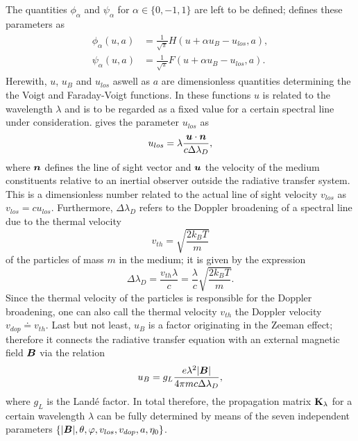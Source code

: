 \documentclass[a4paper,12pt]{report}
\begin{document}
The quantities $\phi_\alpha$ and $\psi_\alpha$ for $\alpha \in \{0,-1,1\}$ are left to be defined; \cite[p.123]{delToroIniesta.2003} defines these parameters as \begin{align}
\begin{aligned}
\phi_\alpha(u,a) &= \frac{1}{\sqrt{\pi}}H(u + \alpha u_B - u_{los}, a), \\
\psi_\alpha(u,a) &= \frac{1}{\sqrt{\pi}}F(u + \alpha u_B - u_{los},a).
\end{aligned}
\end{align} Herewith, $u$, $u_B$ and $u_{los}$ aswell as $a$ are dimensionless quantities determining the the Voigt and Faraday-Voigt functions. In these functions $u$ is related to the wavelength $\lambda$ and is to be regarded as a fixed value for a certain spectral line under consideration. \cite[p.21]{UitenbroekNSME.2020} gives the parameter $u_{los}$ as \begin{equation}
u_{los} = \lambda\frac{\bm{u}\cdot\bm{n}}{c\Delta\lambda_D},
\end{equation} where $\bm{n}$ defines the line of sight vector and $\bm{u}$ the velocity of the medium constituents relative to an inertial observer outside the radiative transfer system. This is a dimensionless number related to the actual line of sight velocity $v_{los}$ as $v_{los} = cu_{los}$. Furthermore, $\Delta \lambda_D$ refers to the Doppler broadening of a spectral line due to the thermal velocity \begin{equation}
v_{th} = \sqrt{\frac{2k_BT}{m}}
\end{equation} of the particles of mass $m$ in the medium; it is given by the expression \begin{equation}
\Delta \lambda_D = \frac{v_{th}\lambda}{c} = \frac{\lambda}{c}\sqrt{\frac{2k_B T}{m}}.
\end{equation} Since the thermal velocity of the particles is responsible for the Doppler broadening, one can also call the thermal velocity $v_{th}$ the Doppler velocity $v_{dop} \doteq v_{th}$. Last but not least, $u_B$ is a factor originating in the Zeeman effect; therefore it connects the radiative transfer equation with an external magnetic field $\bm{B}$ via the relation \begin{equation}
u_B = g_L\frac{e\lambda^2|\bm{B}|}{4\pi m c\Delta \lambda_D},
\end{equation} where $g_L$ is the Landé factor. In total therefore, the propagation matrix $\boldsymbol{\mathbf{K}}_\lambda$ for a certain wavelength $\lambda$ can be fully determined by means of the seven independent parameters $\{|\bm{B}|, \theta, \varphi, v_{los}, v_{dop}, a, \eta_0\}$.
\end{document}
